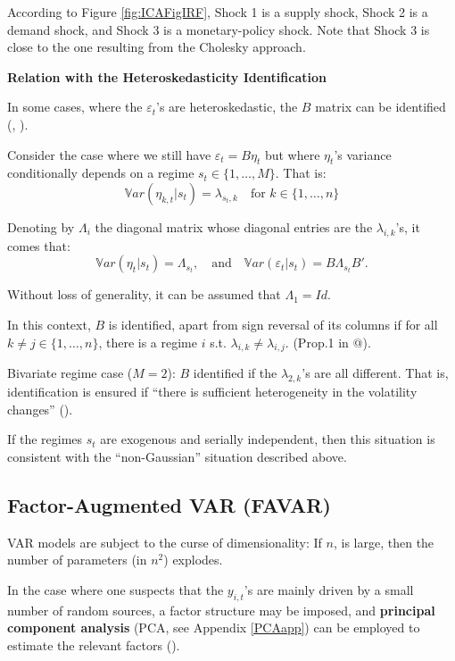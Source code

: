 \documentclass[
  12pt,
]{book}
\theoremstyle{definition}
\theoremstyle{definition}
\theoremstyle{definition}
\theoremstyle{definition}
\theoremstyle{remark}
\begin{document}
According to Figure \ref{fig:ICAFigIRF}, Shock 1 is a supply shock, Shock 2 is a demand shock, and Shock 3 is a monetary-policy shock. Note that Shock 3 is close to the one resulting from the Cholesky approach.

\textbf{Relation with the Heteroskedasticity Identification}

In some cases, where the \(\varepsilon_t\)'s are heteroskedastic, the \(B\) matrix can be identified (\citet{Rigobon_2003}, \citet{LANNE2010121}).

Consider the case where we still have \(\varepsilon_t = B \eta_t\) but where \(\eta_t\)'s variance conditionally depends on a regime \(s_t \in \{1,\dots,M\}\). That is:
\[
\mathbb{V}ar(\eta_{k,t}|s_t) = \lambda_{s_t,k} \quad \mbox{for } k \in \{1,\dots,n\}
\]

Denoting by \(\Lambda_i\) the diagonal matrix whose diagonal entries are the \(\lambda_{i,k}\)'s, it comes that:
\[
\mathbb{V}ar(\eta_{t}|s_t) = \Lambda_{s_t},\quad \mbox{and}\quad \mathbb{V}ar(\varepsilon_{t}|s_t) = B\Lambda_{s_t}B'.
\]

Without loss of generality, it can be assumed that \(\Lambda_1=Id\).

In this context, \(B\) is identified, apart from sign reversal of its columns if for all \(k \ne j \in \{1,\dots,n\}\), there is a regime \(i\) s.t. \(\lambda_{i,k} \ne \lambda_{i,j}\). (Prop.1 in @\citet{LANNE2010121}).

Bivariate regime case (\(M=2\)): \(B\) identified if the \(\lambda_{2,k}\)'s are all different. That is, identification is ensured if ``there is sufficient heterogeneity in the volatility changes'' (\citet{LUTKEPOHL20172}).

If the regimes \(s_t\) are exogenous and serially independent, then this situation is consistent with the ``non-Gaussian'' situation described above.

\hypertarget{factor-augmented-var-favar}{%
\subsection{Factor-Augmented VAR (FAVAR)}\label{factor-augmented-var-favar}}

VAR models are subject to the curse of dimensionality: If \(n\), is large, then the number of parameters (in \(n^2\)) explodes.

In the case where one suspects that the \(y_{i,t}\)'s are mainly driven by a small number of random sources, a factor structure may be imposed, and \textbf{principal component analysis} (PCA, see Appendix \ref{PCAapp}) can be employed to estimate the relevant factors (\citet{Bernanke_Boivin_Eliasz_2005}).
\end{document}
